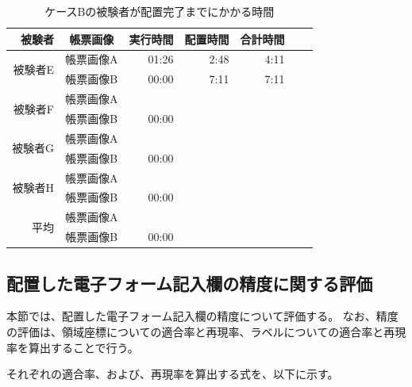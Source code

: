 \begin{table}[t]
	\caption{ケースBの被験者が配置完了までにかかる時間}
	\label{tb:result_caseB_time}
	\centering
	\begin{tabular}{rc||rrrr|r}
		被験者 & 帳票画像 & 実行時間 & 配置時間 & 合計時間 \\
        \hline \hline

		\multirow{2}{*}{被験者E} &  帳票画像A & 01:26 & 2:48 & 4:11 \\
                                &   帳票画像B & 00:00 & 7:11 & 7:11 \\
                                \hline

		\multirow{2}{*}{被験者F} &  帳票画像A &  & &  \\
                                &   帳票画像B & 00:00 &  &  \\
                                \hline

		\multirow{2}{*}{被験者G} &  帳票画像A & &  &  \\
                                &   帳票画像B & 00:00 &  &  \\
                                \hline

		\multirow{2}{*}{被験者H} &  帳票画像A & &  &  \\
                                &   帳票画像B & 00:00 &  &  \\
                                \hline \hline

		\multirow{2}{*}{平均}   &  帳票画像A &  &  &  \\
                               &   帳票画像B & 00:00 &  &  \\
	\end{tabular}
\end{table}

\subsection{配置した電子フォーム記入欄の精度に関する評価}\label{subsec:evalue_accuracy}
本節では、配置した電子フォーム記入欄の精度について評価する。
なお、精度の評価は、領域座標についての適合率と再現率、ラベルについての適合率と再現率を算出することで行う。

それぞれの適合率、および、再現率を算出する式を、以下に示す。

